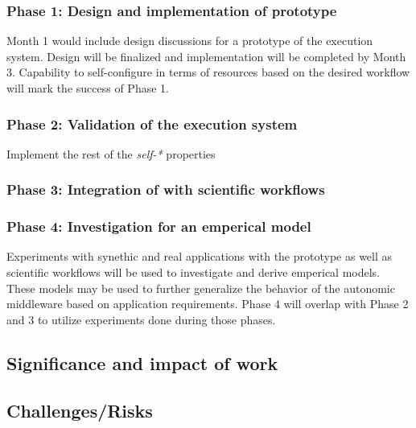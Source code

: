 \subsubsection{Phase 1: Design and implementation of prototype}

Month 1 would include design discussions for a prototype of the
execution system. Design will be finalized and implementation will be
completed by Month 3. Capability to self-configure in terms of resources
based on the desired workflow will mark the success of Phase 1.


\subsubsection{Phase 2: Validation of the execution system}

Implement the rest of the \textit{self-*} properties

\subsubsection{Phase 3: Integration of with scientific workflows}


\subsubsection{Phase 4: Investigation for an emperical model}

Experiments with synethic and real applications with the prototype as well as 
scientific workflows will be used to investigate and derive emperical models. 
These models may be used to further generalize the behavior of the autonomic 
middleware based on application requirements. Phase 4 will overlap with Phase 2 
and 3 to utilize experiments done during those phases.

\subsection{Significance and impact of work}


\subsection{Challenges/Risks}


